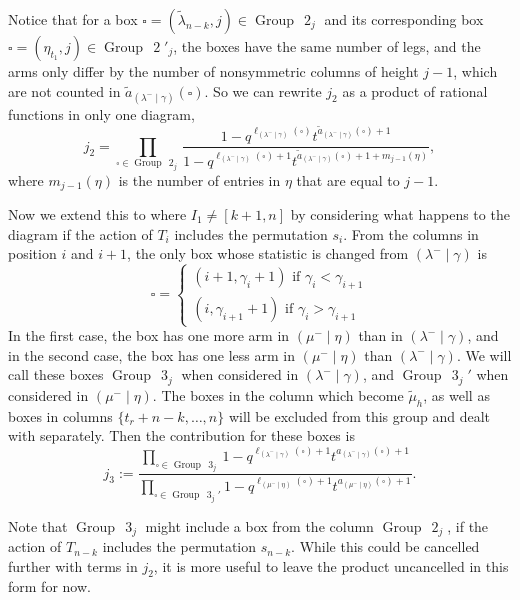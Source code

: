 \documentclass[ALCO]{cedram}
\newcommand{\mutilde}{{\widetilde{\mu}}}
\newcommand{\lambdatilde}{{\widetilde{\lambda}}}
\newcommand{\lambdamingamma}{(\lambda^- \mid \gamma)}
\newcommand{\mumineta}{(\mu^- \mid \eta)}
\newcommand{\leg}[1]{{\ell_{#1}(\square)}}
\newcommand{\armone}[1]{{\widetilde{a}_{#1}(\square)}}
\newcommand{\armtwo}[1]{{a_{#1}(\square)}}
\newcommand{\group}[1]{\operatorname{Group}\,\operatorname{#1}}
\newcommand{\jtwo}{j_2}
\newcommand{\jthree}{j_3}
\begin{document}
Notice that for a box $\square=(\lambdatilde_{n-k},j)\in \group{2}_j$ and its corresponding box $ \square = (\eta_{t_1},j) \in \group{2}'_j$, the boxes have the same number of legs, and the arms only differ by the number of nonsymmetric columns of height $j-1$, which are not counted in $\armone{\lambdamingamma}$. So we can rewrite $\jtwo$ as a product of rational functions in only one diagram,
\begin{equation} \label{groupBproduct} \jtwo  = \prod\limits_{\square \in \group{2}_j}\frac{1-q^{\leg{\lambdamingamma}}t^{\armone{\lambdamingamma}+1} }{ 1-q^{\leg{\lambdamingamma}+1}t^{\armone{\lambdamingamma}+1+m_{j-1}(\eta)}}, \end{equation}
where $m_{j-1}(\eta)$ is the number of entries in $\eta$ that are equal to $j-1$.

Now we extend this to where $I_1 \neq [k+1,n]$ by considering what happens to the diagram if the action of $T_i$ includes the permutation $s_i$. From the columns in position $i$ and $i+1$, the only box whose statistic is changed from $\lambdamingamma$ is
\[ \square = \begin{cases} (i+1,\gamma_i+1) \text{ if } \gamma_i < \gamma_{i+1}\\ (i,\gamma_{i+1}+1) \text{ if } \gamma_i > \gamma_{i+1} \end{cases}\]
In the first case, the box has one more arm in $\mumineta$ than in $\lambdamingamma$, and in the second case, the box has one less arm in $\mumineta$ than $\lambdamingamma$. We will call these boxes $\group{3}_j$ when considered in $\lambdamingamma$, and $\group{3}_j'$ when considered in $\mumineta$. The boxes in the column which become $\mutilde_h$, as well as boxes in columns $\{t_r+n-k, \dotsc, n\}$ will be excluded from this group and dealt with separately. Then the contribution for these boxes is
\begin{equation}\label{groupCproduct} \jthree := \frac{\prod\limits_{\square \in \group{3}_j}1-q^{\leg{\lambdamingamma}+1}t^{\armtwo{\lambdamingamma}+1} }{\prod\limits_{\square \in \group{3}_j'} 1-q^{\leg{\mumineta}+1}t^{\armtwo{\mumineta}+1}}.\end{equation}

Note that $\group{3}_j$ might include a box from the column $\group{2}_j$, if the action of $T_{n-k}$ includes the permutation $s_{n-k}$. While this could be cancelled further with terms in $\jtwo$, it is more useful to leave the product uncancelled in this form for now.
\end{document}
